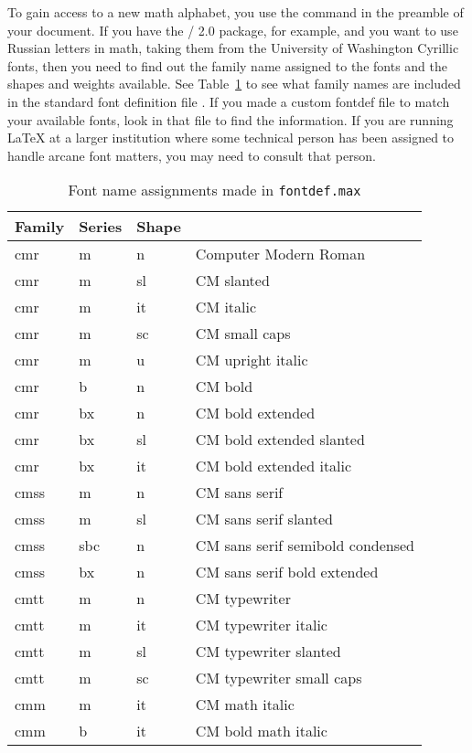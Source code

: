 To gain access to a new math alphabet, you use the
 command in the preamble of your document.
If you have the \amsfonts/ 2.0 package, for example, and you want to use
Russian letters in math, taking them from the University of Washington
Cyrillic fonts, then you need
to find out the family name assigned to the fonts and
the shapes and weights available.  See Table~\ref{fonts}
to see what family names are included in the standard font definition
file .  If you made a custom fontdef file
to match your available fonts, look in that file to find
the information.  If you are running \LaTeX{} at a larger
institution where some technical person has been assigned
to handle arcane font matters, you may need to consult that
person.

\begin{table}[htp]
\caption{Font name assignments made in {\tt fontdef.max}}
\label{fonts}
\medskip
\begin{tabular}{|lllp{17pc}|}
\hline
\multicolumn{1}{|c}{Family}&     \multicolumn{1}{c}{Series}&
        \multicolumn{1}{c}{Shape}&  \\
\hline
cmr&   m&     n& Computer Modern Roman\\
cmr&   m&     sl& CM slanted\\
cmr&   m&     it& CM italic\\
cmr&   m&     sc& CM small caps\\
cmr&   m&     u& CM upright italic\\
cmr&   b&     n& CM bold\\
cmr&   bx&    n& CM bold extended\\
cmr&   bx&    sl& CM bold extended slanted\\
cmr&   bx&    it& CM bold extended italic\\
cmss&  m&     n& CM sans serif\\
cmss&  m&     sl& CM sans serif slanted\\
cmss&  sbc&   n& CM sans serif semibold condensed\\
cmss&  bx&    n& CM sans serif bold extended\\
cmtt&  m&     n& CM typewriter\\
cmtt&  m&     it& CM typewriter italic\\
cmtt&  m&     sl& CM typewriter slanted\\
cmtt&  m&     sc& CM typewriter small caps\\
cmm&   m&     it& CM math italic\\
cmm&   b&     it& CM bold math italic\\

\end{tabular}
\end{table}
